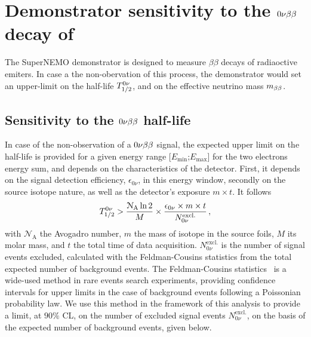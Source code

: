 \section{Demonstrator sensitivity to the $0\nu\beta\beta$ decay of \Se}
\label{sec:Nbkg_ROI}

The SuperNEMO demonstrator is designed to measure $\beta\beta$ decays of radiaoctive emiters.
In case a the non-obervation of this process, the demonstrator would set an upper-limit on the half-life $T_{1/2}^{0\nu}$, and on the effective neutrino mass $m_{\beta\beta}$.

\subsection{Sensitivity to the $0\nu\beta\beta$ half-life}

In case of the non-observation of a $0\nu\beta\beta$ signal, the expected upper limit on the half-life is provided for a given energy range [$E_{\text{min}}$;$E_{\text{max}}$] for the two electrons energy sum, and depends on the characteristics of the detector.
First, it depends on the signal detection efficiency, $\epsilon_{0\nu}$, in this energy window, secondly on the source isotope nature, as well as the detector's exposure $m\times t$.
It follows
\begin{equation}
  T_{1/2}^{0\nu} > \frac{\mathcal{N}_{\text{A}}\ln{2}}{M}\times \frac{\epsilon_{0\nu}\times m\times t}{N_{0\nu}^{\text{excl.}}}\,,
  \label{eq:tbeta_limit}
\end{equation}
with $\mathcal{N}_{\text{A}}$ the Avogadro number, $m$ the mass of isotope in the source foils, $M$ its molar mass, and $t$ the total time of data acquisition.
$N_{0\nu}^{\text{excl.}}$ is the number of signal events excluded, calculated with the Feldman-Cousins statistics from the total expected number of background events.
The Feldman-Cousins statistics~\cite{art:feld-cous} is a wide-used method in rare events search experiments, providing confidence intervals for upper limits in the case of background events following a Poissonian probability law.
We use this method in the framework of this analysis to provide a limit, at $90\%$ CL, on the number of excluded signal events $N_{0\nu}^{\text{excl.}}$, on the basis of the expected number of background events, given below.
